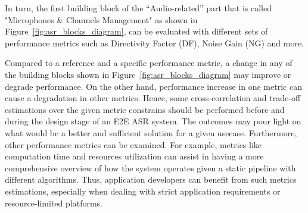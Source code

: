 \bigskip

In turn, the first building block of the 
``Audio-related'' part that is called 
"Microphones \& Channels Management" as shown 
in Figure~\ref{fig:asr_blocks_diagram},
can be evaluated with 
different sets of performance metrics 
such as Directivity Factor (DF),
Noise Gain (NG) and more.

Compared to a reference and a specific performance metric, 
a change in any of the building blocks 
shown in Figure~\ref{fig:asr_blocks_diagram} may 
improve or degrade performance. 
On the other hand,
performance increase in one metric can cause 
a degradation in other metrics.
Hence, some cross-correlation and trade-off estimations
over the given metric constrains should be performed
before and during the design stage of an E2E ASR system. 
The outcomes may pour light on what would be a better
and sufficient solution for a given usecase. 
Furthermore, other performance metrics can be examined.
For example, metrics like computation time and resources utilization
can assist in having a more comprehensive overview of how the system operates given a
static pipeline with different algorithms.
Thus, application
developers can benefit from such metrics estimations,
especially when dealing with strict 
application requirements or resource-limited platforms.






